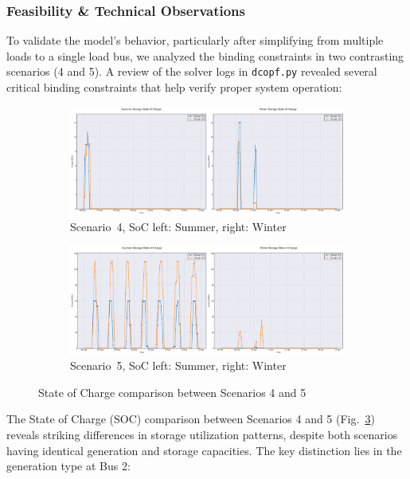 \subsubsection{Feasibility \& Technical Observations}
To validate the model's behavior, particularly after simplifying from multiple loads to a single load bus, 
we analyzed the binding constraints in two contrasting scenarios (4 and 5). A review of the solver logs in 
\texttt{dcopf.py} revealed several critical binding constraints that help verify proper system operation:

\begin{figure}[h]
    \centering
    \begin{subfigure}[b]{0.48\textwidth}
        \includegraphics[width=\textwidth]{images/soc_4.png}
        \caption{Scenario~4, SoC left: Summer, right: Winter}
        \label{fig:soc_4}
    \end{subfigure}
    \hfill
    \begin{subfigure}[b]{0.48\textwidth}
        \includegraphics[width=\textwidth]{images/soc_5.png}
        \caption{Scenario~5, SoC left: Summer, right: Winter}
        \label{fig:soc_5}
    \end{subfigure}
    \caption{State of Charge comparison between Scenarios 4 and 5}
    \label{fig:soc_comparison}
\end{figure}

The State of Charge (SOC) comparison between Scenarios 4 and 5 (Fig.~\ref{fig:soc_comparison}) reveals striking 
differences in storage utilization patterns, despite both scenarios having identical generation and storage 
capacities. The key distinction lies in the generation type at Bus 2:

